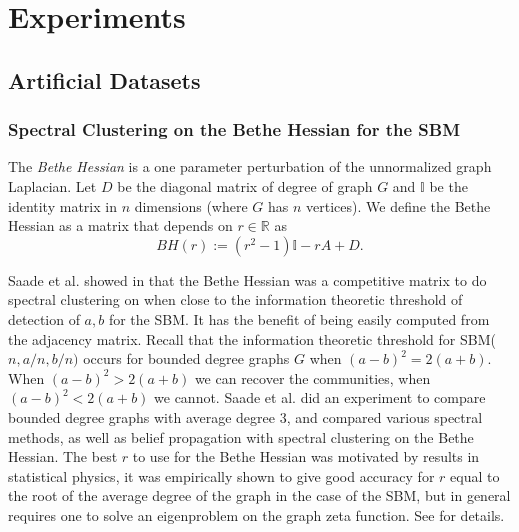 \chapter{Experiments}
\section{Artificial Datasets}

\subsection{Spectral Clustering on the Bethe Hessian for the SBM}
\begin{definition}The 
\textit{Bethe Hessian} is a one parameter perturbation of the unnormalized graph Laplacian.  Let $D$ be the diagonal matrix of degree of graph $G$ and $\mathbb{I}$ be the identity matrix in $n$ dimensions (where $G$ has $n$ vertices).  We define the Bethe Hessian as a matrix that depends on $r \in \mathbb{R}$ as  $$BH(r) := (r^2-1)\mathbb{I} - rA +D.$$
\end{definition}

Saade et al. showed in \cite{AFL} that the Bethe Hessian was a competitive matrix to do spectral clustering on when close to the information theoretic threshold of detection of $a,b$ for the SBM.  It has the benefit of being easily computed from the adjacency matrix. Recall that the information theoretic threshold for SBM($n, a/n, b/n)$ occurs for bounded degree graphs $G$ when $(a-b)^2 = 2(a+b)$.  When $(a-b)^2 > 2(a+b)$ we can recover the communities, when $(a-b)^2 < 2(a+b)$ we cannot.  Saade et al. did an experiment to compare bounded degree graphs with average degree 3, and compared various spectral methods, as well as belief propagation with spectral clustering on the Bethe Hessian. The best $r$ to use for the Bethe Hessian was motivated by results in statistical physics, it was empirically shown to give good accuracy for $r$ equal to the root of the average degree of the graph in the case of the SBM, but in general requires one to solve an eigenproblem on the graph zeta function.  See \cite{AFL} for details. 

